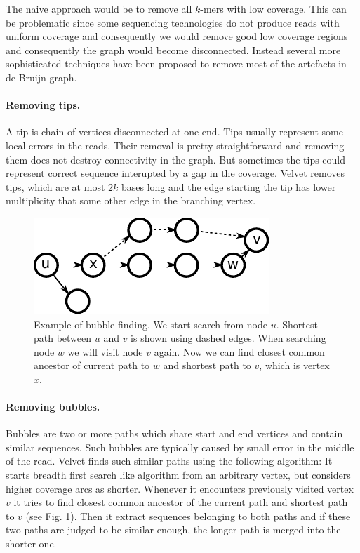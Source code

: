 The naive approach would be to remove all $k$-mers with low coverage.
This can be problematic since some sequencing technologies do not produce reads with uniform coverage
and consequently we would remove good low coverage regions and consequently the graph would become disconnected.
Instead several more sophisticated techniques have been proposed to remove
most of the artefacts in de Bruijn graph.

\paragraph{Removing tips.} A tip is chain of vertices disconnected at one end. 
Tips usually represent some local errors in the reads. Their removal is pretty straightforward
and removing them does not destroy connectivity in the graph. But sometimes the tips
could represent correct sequence interupted by a gap in the coverage.
Velvet \citep{Velvet} removes tips, which are at most $2k$ bases long and the edge starting
the tip has lower multiplicity that some other edge in the branching vertex.

\begin{figure}
  \centerline{\includegraphics[scale=0.9]{../figures/bubblefind.pdf}}
  \caption{Example of bubble finding. We start search from node $u$. Shortest path between
$u$ and $v$ is shown using dashed edges. When searching node $w$ we will visit node
$v$ again. Now we can find closest common ancestor of current path to $w$ and shortest path to $v$,
which is vertex $x$.}
\label{fig:bubblerem}
\end{figure}

\paragraph{Removing bubbles.} Bubbles are two or more paths which share start and end vertices
and contain similar sequences.
Such bubbles are typically caused by small error in the middle of the read.
Velvet finds such similar paths using the following algorithm:
It starts breadth first search like algorithm from an arbitrary vertex, but considers higher coverage
arcs as shorter. Whenever it encounters previously visited vertex $v$ it tries to find closest common ancestor
of the current path and shortest path to $v$ (see Fig. \ref{fig:bubblerem}). Then it extract
sequences belonging to both paths and
if these two paths are judged to be similar enough, the longer path is merged into the shorter one. 
 
